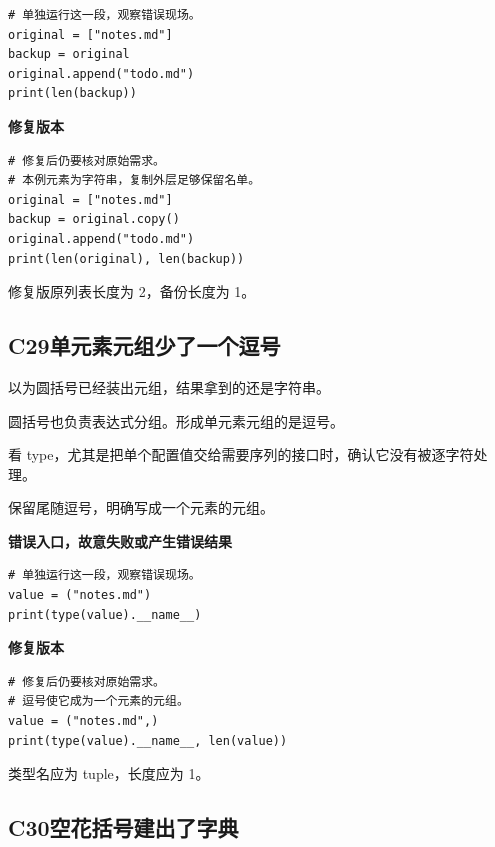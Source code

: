 \documentclass[UTF8,a4paper,oneside,openany,fontset=none,11pt]{ctexbook}
\newcommand{\code}[1]{\texttt{\detokenize{#1}}}
\newcommand{\CaseStep}[2]{\par\smallskip{\bfseries\color{Muted}#1}\enspace #2\par}
\begin{document}
\begin{lstlisting}[style=errorcode,title={错误复现（故意失败或错误结果）：\code{case_28_bad.py.txt}}]
# 单独运行这一段，观察错误现场。
original = ["notes.md"]
backup = original
original.append("todo.md")
print(len(backup))
\end{lstlisting}

\textbf{修复版本}

\begin{lstlisting}[title={\code{case_28.py}}]
# 修复后仍要核对原始需求。
# 本例元素为字符串，复制外层足够保留名单。
original = ["notes.md"]
backup = original.copy()
original.append("todo.md")
print(len(original), len(backup))
\end{lstlisting}

\CaseStep{复验}{修复版原列表长度为 2，备份长度为 1。}

\subsection*{C29\enspace 单元素元组少了一个逗号}

\CaseStep{现象}{以为圆括号已经装出元组，结果拿到的还是字符串。}

\CaseStep{原因}{圆括号也负责表达式分组。形成单元素元组的是逗号。}

\CaseStep{排查}{看 type，尤其是把单个配置值交给需要序列的接口时，确认它没有被逐字符处理。}

\CaseStep{修复}{保留尾随逗号，明确写成一个元素的元组。}

\textbf{错误入口，故意失败或产生错误结果}

\begin{lstlisting}[style=errorcode,title={错误复现（故意失败或错误结果）：\code{case_29_bad.py.txt}}]
# 单独运行这一段，观察错误现场。
value = ("notes.md")
print(type(value).__name__)
\end{lstlisting}

\textbf{修复版本}

\begin{lstlisting}[title={\code{case_29.py}}]
# 修复后仍要核对原始需求。
# 逗号使它成为一个元素的元组。
value = ("notes.md",)
print(type(value).__name__, len(value))
\end{lstlisting}

\CaseStep{复验}{类型名应为 tuple，长度应为 1。}

\subsection*{C30\enspace 空花括号建出了字典}
\end{document}

